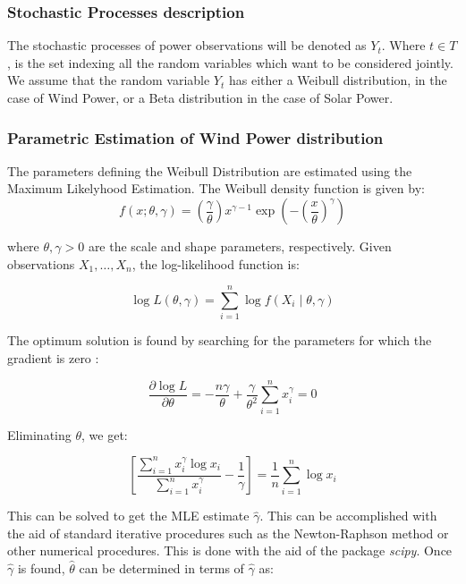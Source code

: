 \subsubsection{Stochastic Processes description}
The stochastic processes of power observations will be denoted as \(Y_t\). Where \(t \in T\), is the set indexing all the random variables which want to be considered jointly.
We assume that the random variable \(Y_t\) has either a Weibull distribution, in the case of Wind Power, or a Beta distribution in the case of Solar Power. 

\subsubsection{Parametric Estimation of Wind Power distribution}
\label{subsection: weib estim}
The parameters defining the Weibull Distribution are estimated using the Maximum Likelyhood Estimation. The Weibull density function is given by:
\[
f(x; \theta, \gamma) = \left(\frac{\gamma}{\theta}\right)x^{\gamma-1}\exp\left(-\left(\frac{x}{\theta}\right)^\gamma\right)
\]

where \(\theta, \gamma > 0\) are the scale and shape parameters, respectively. Given observations \(X_1, \ldots, X_n\), the log-likelihood function is:

\[
\log L(\theta, \gamma) = \sum_{i=1}^n \log f(X_i \mid \theta, \gamma)
\]

The optimum solution is found by searching for the parameters for which the gradient is zero :

\begin{equation}
\frac{\partial \log L}{\partial \theta} = -\frac{n \gamma}{\theta} + \frac{\gamma}{\theta^2} \sum_{i=1}^{n} x_i^\gamma = 0
\end{equation}

Eliminating $\theta$, we get:

\begin{equation}
\left[ \frac{\sum_{i=1}^{n} x_i^\gamma \log x_i}{\sum_{i=1}^{n} x_i^\gamma} - \frac{1}{\gamma} \right] = \frac{1}{n} \sum_{i=1}^{n} \log x_i
\end{equation}

This can be solved to get the MLE estimate $\hat{\gamma}$. This can be accomplished with the aid of standard iterative procedures such as the Newton-Raphson method or other numerical procedures. This is done with the aid of the package \emph{scipy}. Once $\hat{\gamma}$ is found, $\hat{\theta}$ can be determined in terms of $\hat{\gamma}$ as:

